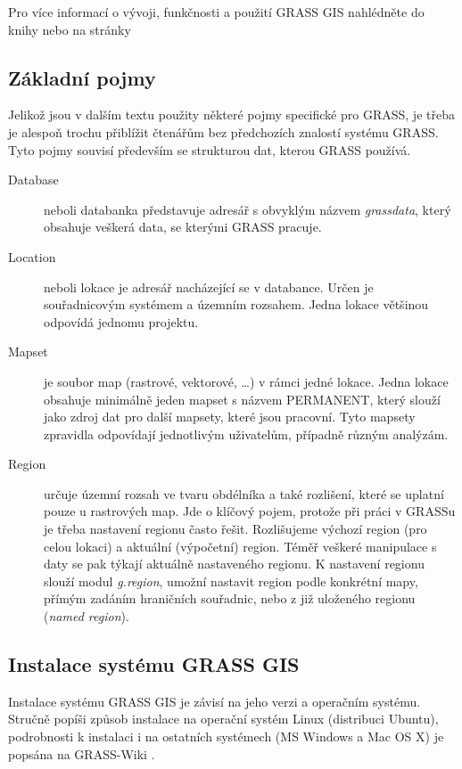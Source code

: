 \documentclass[a4paper,12pt,draft]{article}
\begin{document}
Pro více informací o vývoji, funkčnosti a použití GRASS GIS nahlédněte do knihy \cite{grass_gis} nebo na stránky %

\subsection{Základní pojmy}
\label{sec:grass:pojmy}
Jelikož jsou v dalším textu použity některé pojmy specifické pro GRASS, je třeba je alespoň trochu přiblížit čtenářům bez předchozích znalostí systému GRASS. Tyto pojmy souvisí především se strukturou dat, kterou GRASS používá.

\begin{description}
\item[Database] neboli databanka představuje adresář s obvyklým názvem \emph{grassdata}, který obsahuje veškerá data, se kterými GRASS pracuje.
\item [Location] neboli lokace je adresář nacházející se v databance. Určen je souřadnicovým systémem a územním rozsahem. Jedna lokace většinou odpovídá jednomu projektu.
\item [Mapset] je soubor map (rastrové, vektorové, \ldots) v rámci jedné lokace. Jedna lokace obsahuje minimálně jeden mapset s názvem PERMANENT, který  slouží jako zdroj dat pro další mapsety, které jsou pracovní. Tyto mapsety zpravidla odpovídají jednotlivým uživatelům, případně různým analýzám.
\item [Region] určuje územní rozsah ve tvaru obdélníka a také rozlišení, které se uplatní pouze u rastrových map. Jde o klíčový pojem, protože při práci v GRASSu je třeba nastavení regionu často řešit.  Rozlišujeme výchozí region (pro celou lokaci) a aktuální (výpočetní) region. Téměř veškeré manipulace s daty se pak týkají aktuálně nastaveného regionu. K nastavení regionu slouží modul \emph{g.region}, umožní nastavit region podle konkrétní mapy, přímým zadáním hraničních souřadnic, nebo z již uloženého regionu (\emph{named region}). 
 \end{description}

\subsection{Instalace systému GRASS GIS}
Instalace systému GRASS GIS je závisí na jeho verzi a operačním systému. Stručně popíši způsob instalace na operační systém Linux (distribuci Ubuntu), podrobnosti k instalaci i na ostatních systémech (MS Windows a Mac OS X) je popsána na GRASS-Wiki \cite{instalace}.
\end{document}

